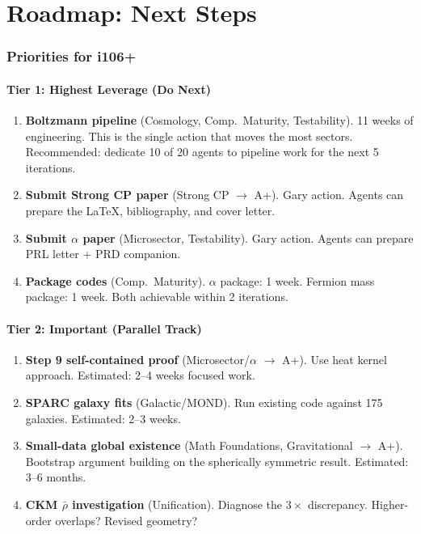 \documentclass[11pt,a4paper]{article}
\begin{document}
\newpage
\part{Roadmap: Next Steps}
\label{part:roadmap}

\section{Priorities for i106+}

\subsection{Tier 1: Highest Leverage (Do Next)}

\begin{enumerate}
\item \textbf{Boltzmann pipeline} (Cosmology, Comp.\ Maturity, Testability).
  11 weeks of engineering. This is the single action that moves the most sectors.
  Recommended: dedicate 10 of 20 agents to pipeline work for the next 5 iterations.

\item \textbf{Submit Strong CP paper} (Strong CP $\to$ A+).
  Gary action. Agents can prepare the LaTeX, bibliography, and cover letter.

\item \textbf{Submit $\alpha$ paper} (Microsector, Testability).
  Gary action. Agents can prepare PRL letter + PRD companion.

\item \textbf{Package codes} (Comp.\ Maturity).
  $\alpha$ package: 1 week. Fermion mass package: 1 week. Both achievable
  within 2 iterations.
\end{enumerate}

\subsection{Tier 2: Important (Parallel Track)}

\begin{enumerate}
\item \textbf{Step 9 self-contained proof} (Microsector/$\alpha$ $\to$ A+).
  Use heat kernel approach. Estimated: 2--4 weeks focused work.

\item \textbf{SPARC galaxy fits} (Galactic/MOND).
  Run existing code against 175 galaxies. Estimated: 2--3 weeks.

\item \textbf{Small-data global existence} (Math Foundations, Gravitational $\to$ A+).
  Bootstrap argument building on the spherically symmetric result.
  Estimated: 3--6 months.

\item \textbf{CKM $\bar\rho$ investigation} (Unification).
  Diagnose the $3\times$ discrepancy. Higher-order overlaps? Revised geometry?
\end{enumerate}
\end{document}
